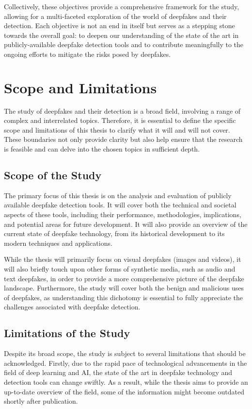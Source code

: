Collectively, these objectives provide a comprehensive framework for the study, allowing 
for a multi-faceted exploration of the world of deepfakes and their detection. Each 
objective is not an end in itself but serves as a stepping stone towards the overall 
goal: to deepen our understanding of the state of the art in publicly-available deepfake 
detection tools and to contribute meaningfully to the ongoing efforts to mitigate the 
risks posed by deepfakes.

\section{Scope and Limitations}\label{chapter:scope}
The study of deepfakes and their detection is a broad field, involving a range of complex and 
interrelated topics. Therefore, it is essential to define the specific scope and 
limitations of this thesis to clarify what it will and will not cover. These boundaries 
not only provide clarity but also help ensure that the research is feasible and can delve 
into the chosen topics in sufficient depth.

\subsection{Scope of the Study}
The primary focus of this thesis is on the analysis and evaluation of publicly available 
deepfake detection tools. It will cover both the technical and societal aspects of these 
tools, including their performance, methodologies, implications, and potential areas for 
future development. It will also provide an overview of the current state of deepfake 
technology, from its historical development to its modern techniques and applications.

While the thesis will primarily focus on visual deepfakes (images and videos), it will 
also briefly touch upon other forms of synthetic media, such as audio and text deepfakes, 
in order to provide a more comprehensive picture of the deepfake landscape. Furthermore, 
the study will cover both the benign and malicious uses of deepfakes, as understanding 
this dichotomy is essential to fully appreciate the challenges associated with deepfake 
detection.

\subsection{Limitations of the Study}
Despite its broad scope, the study is subject to several limitations that should be 
acknowledged. Firstly, due to the rapid pace of technological advancements in the field 
of deep learning and \ac{AI}, the state of the art in deepfake technology and detection tools 
can change swiftly. As a result, while the thesis aims to provide an up-to-date overview 
of the field, some of the information might become outdated shortly after publication.

